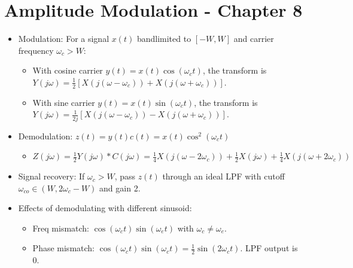 \documentclass[10pt, twocolumn]{article}
\begin{document}
\section{Amplitude Modulation - Chapter 8}
\begin{itemize}
    \item Modulation: For a signal $x(t)$ bandlimited to $[-W, W]$ and carrier frequency $\omega_c > W$:
        \begin{itemize}
            \item With cosine carrier $y(t) = x(t)\cos(\omega_c t)$, the transform is\\ $Y(j\omega) = \frac{1}{2}[X(j(\omega-\omega_c)) + X(j(\omega+\omega_c))]$.
            \item With sine carrier $y(t) = x(t)\sin(\omega_c t)$, the transform is\\ $Y(j\omega) = \frac{1}{2j}[X(j(\omega-\omega_c)) - X(j(\omega+\omega_c))]$.
        \end{itemize}
    \item Demodulation: $z(t) = y(t)c(t) = x(t)\cos^2(\omega_c t)$
        \begin{itemize}
            \item $Z(j\omega) = \frac{1}{2}Y(j\omega)*C(j\omega) = \frac{1}{4}X(j(\omega-2\omega_c)) + \frac{1}{2}X(j\omega) + \frac{1}{4}X(j(\omega+2\omega_c))$
        \end{itemize}
    \item Signal recovery: If $\omega_c > W$, pass $z(t)$ through an ideal LPF with cutoff $\omega_{co} \in (W, 2\omega_c-W)$ and gain 2.
    \item Effects of demodulating with different sinusoid:
        \begin{itemize}
            \item Freq mismatch: $\cos(\omega_c t)\sin(\omega_e t)$ with $\omega_c \neq \omega_e$.
            \item Phase mismatch: $\cos(\omega_c t)\sin(\omega_c t) = \frac{1}{2}\sin(2\omega_c t)$. LPF output is 0.
        \end{itemize}
\end{itemize}

\end{document}
